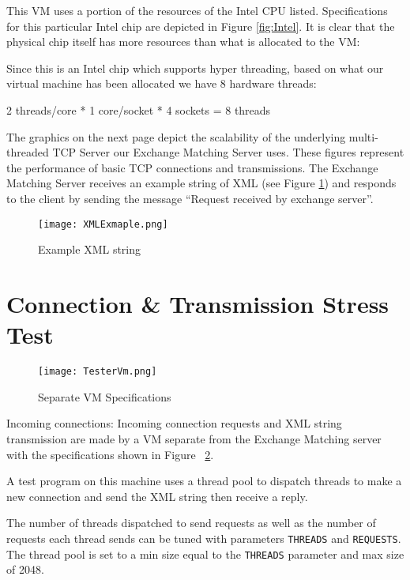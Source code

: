 \documentclass[letterpaper, 10 pt, conference]{ieeeconf}
\begin{document}
This VM uses a portion of the resources of the Intel CPU listed. Specifications for this particular Intel chip are depicted in Figure \ref{fig:Intel}. It is clear that the physical chip itself has more resources than what is allocated to the VM:

Since this is an Intel chip which supports hyper threading, based on what our virtual machine has been allocated we have 8 hardware threads:
 
2 threads/core * 1 core/socket * 4 sockets = 8 threads
 
The graphics on the next page depict the scalability of the underlying multi-threaded TCP Server our Exchange Matching Server uses. These figures represent the performance of basic TCP connections and transmissions. The Exchange Matching Server receives an example string of XML (see Figure \ref{fig:XML}) and responds to the client by sending the message “Request received by exchange server”.
 
 \begin{figure}[!htb]
    \centering
    \texttt{[image: XMLExmaple.png]}
    \caption{Example XML string}
    \label{fig:XML}
\end{figure}
 
 
\section{Connection \& Transmission Stress Test}


 \begin{figure}[!htb]
    \centering
    \texttt{[image: TesterVm.png]}
    \caption{Separate VM Specifications}
    \label{fig:NewVM}
\end{figure}

Incoming connections: Incoming connection requests and XML string transmission are made by a VM separate from the Exchange Matching server with the specifications shown in Figure ~\ref{fig:NewVM}.



A test program on this machine uses a thread 
pool to dispatch threads to make a new 
connection and send the XML string then receive a reply. 



The number of threads dispatched to send 
requests as well as the number of 
requests each thread sends can be 
tuned with parameters \texttt{THREADS} and 
\texttt{REQUESTS}. The thread pool is set to a 
min size equal to the \texttt{THREADS} parameter and max size of 2048.
\end{document}
